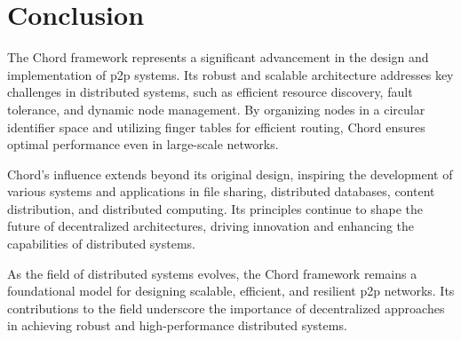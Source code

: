 \chapter{Conclusion}\label{chap:conclusion}
The Chord framework represents a significant advancement in the design and implementation of \gls{p2p} systems.
Its robust and scalable architecture addresses key challenges in distributed systems, such as efficient resource discovery, fault tolerance, and dynamic node management.
By organizing nodes in a circular identifier space and utilizing finger tables for efficient routing, Chord ensures optimal performance even in large-scale networks.

Chord's influence extends beyond its original design, inspiring the development of various systems and applications in file sharing, distributed databases, content distribution, and distributed computing.
Its principles continue to shape the future of decentralized architectures, driving innovation and enhancing the capabilities of distributed systems.

As the field of distributed systems evolves, the Chord framework remains a foundational model for designing scalable, efficient, and resilient \gls{p2p} networks.
Its contributions to the field underscore the importance of decentralized approaches in achieving robust and high-performance distributed systems.